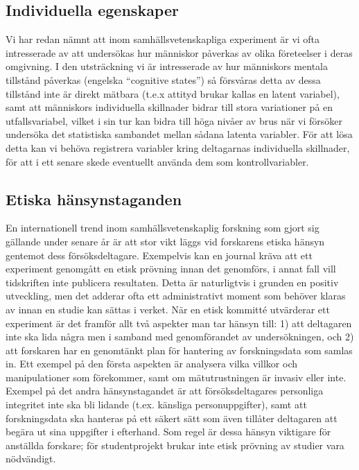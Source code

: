 \documentclass[
]{book}
\begin{document}
\hypertarget{sub07.2.3}{%
\subsection{Individuella egenskaper}\label{sub07.2.3}}

Vi har redan nämnt att inom samhällsvetenskapliga experiment är vi ofta intresserade av att undersökas hur människor påverkas av olika företeelser i deras omgivning. I den utsträckning vi är intresserade av hur människors mentala tillstånd påverkas (engelska ``cognitive states'') så försvåras detta av dessa tillstånd inte är direkt mätbara (t.e.x attityd brukar kallas en latent variabel), samt att människors individuella skillnader bidrar till stora variationer på en utfallsvariabel, vilket i sin tur kan bidra till höga nivåer av brus när vi försöker undersöka det statistiska sambandet mellan sådana latenta variabler. För att lösa detta kan vi behöva registrera variabler kring deltagarnas individuella skillnader, för att i ett senare skede eventuellt använda dem som kontrollvariabler.

\hypertarget{sub07.2.4}{%
\subsection{Etiska hänsynstaganden}\label{sub07.2.4}}

En internationell trend inom samhällsvetenskaplig forskning som gjort sig gällande under senare år är att stor vikt läggs vid forskarens etiska hänsyn gentemot dess försöksdeltagare. Exempelvis kan en journal kräva att ett experiment genomgått en etisk prövning innan det genomförs, i annat fall vill tidskriften inte publicera resultaten. Detta är naturligtvis i grunden en positiv utveckling, men det adderar ofta ett administrativt moment som behöver klaras av innan en studie kan sättas i verket. När en etisk kommitté utvärderar ett experiment är det framför allt två aspekter man tar hänsyn till: 1) att deltagaren inte ska lida några men i samband med genomförandet av undersökningen, och 2) att forskaren har en genomtänkt plan för hantering av forskningsdata som samlas in. Ett exempel på den första aspekten är analysera vilka villkor och manipulationer som förekommer, samt om mätutrustningen är invasiv eller inte. Exempel på det andra hänsynstagandet är att försöksdeltagares personliga integritet inte ska bli lidande (t.ex. känsliga personuppgifter), samt att forskningsdata ska hanteras på ett säkert sätt som även tillåter deltagaren att begära ut sina uppgifter i efterhand. Som regel är dessa hänsyn viktigare för anställda forskare; för studentprojekt brukar inte etisk prövning av studier vara nödvändigt.
\end{document}
